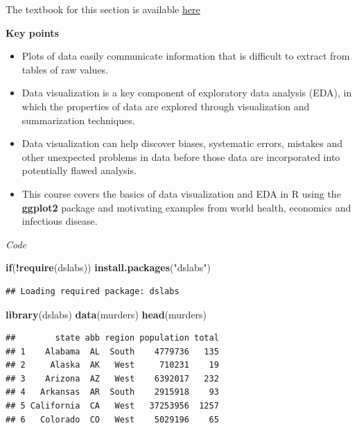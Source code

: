 \documentclass[
]{article}
\newenvironment{Shaded}{\begin{snugshade}}{\end{snugshade}}
\newcommand{\ControlFlowTok}[1]{\textcolor[rgb]{0.13,0.29,0.53}{\textbf{#1}}}
\newcommand{\KeywordTok}[1]{\textcolor[rgb]{0.13,0.29,0.53}{\textbf{#1}}}
\newcommand{\NormalTok}[1]{#1}
\newcommand{\OperatorTok}[1]{\textcolor[rgb]{0.81,0.36,0.00}{\textbf{#1}}}
\newcommand{\StringTok}[1]{\textcolor[rgb]{0.31,0.60,0.02}{#1}}
\providecommand{\tightlist}{%
  \setlength{\itemsep}{0pt}\setlength{\parskip}{0pt}}
\begin{document}
The textbook for this section is available
\href{https://rafalab.github.io/dsbook/introduction-to-data-visualization.html}{here}

\textbf{Key points}

\begin{itemize}
\tightlist
\item
  Plots of data easily communicate information that is difficult to
  extract from tables of raw values.
\item
  Data visualization is a key component of exploratory data analysis
  (EDA), in which the properties of data are explored through
  visualization and summarization techniques.
\item
  Data visualization can help discover biases, systematic errors,
  mistakes and other unexpected problems in data before those data are
  incorporated into potentially flawed analysis.
\item
  This course covers the basics of data visualization and EDA in R using
  the \textbf{ggplot2} package and motivating examples from world
  health, economics and infectious disease.
\end{itemize}

\emph{Code}

\begin{Shaded}
\begin{Highlighting}[]
\ControlFlowTok{if}\NormalTok{(}\OperatorTok{!}\KeywordTok{require}\NormalTok{(dslabs)) }\KeywordTok{install.packages}\NormalTok{(}\StringTok{"dslabs"}\NormalTok{)}
\end{Highlighting}
\end{Shaded}

\begin{verbatim}
## Loading required package: dslabs
\end{verbatim}

\begin{Shaded}
\begin{Highlighting}[]
\KeywordTok{library}\NormalTok{(dslabs)}
\KeywordTok{data}\NormalTok{(murders)}
\KeywordTok{head}\NormalTok{(murders)}
\end{Highlighting}
\end{Shaded}

\begin{verbatim}
##        state abb region population total
## 1    Alabama  AL  South    4779736   135
## 2     Alaska  AK   West     710231    19
## 3    Arizona  AZ   West    6392017   232
## 4   Arkansas  AR  South    2915918    93
## 5 California  CA   West   37253956  1257
## 6   Colorado  CO   West    5029196    65
\end{verbatim}
\end{document}
